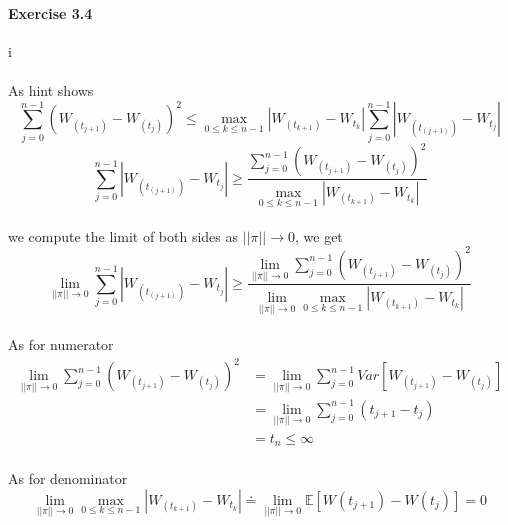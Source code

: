 \documentclass{article}
\begin{document}
\paragraph{Exercise 3.4}{i}
\paragraph{}{As hint shows \begin{displaymath}
                             \sum_{j=0}^{n-1}(W_{(t_{j+1})}-W_{(t_j)})^2 \le \max_{0\le k\le n-1}|W_{(t_{k+1})}-W_{t_{k}}| \sum_{j=0}^{n-1}|W_{(t_{(j+1)})}-W_{t_j}|
                           \end{displaymath}}
\begin{displaymath}
   \sum_{j=0}^{n-1}|W_{(t_{(j+1)})}-W_{t_j}|\ge \frac{ \sum_{j=0}^{n-1}(W_{(t_{j+1})}-W_{(t_j)})^2}{\max_{0\le k\le n-1}|W_{(t_{k+1})}-W_{t_{k}}|}
\end{displaymath}
\paragraph{}{we compute the limit of both sides as $||\pi|| \to 0 $, we get \begin{displaymath}
                                                                              \lim_{||\pi|| \to 0}\sum_{j=0}^{n-1}|W_{(t_{(j+1)})}-W_{t_j}|\ge
\frac{\lim_{||\pi|| \to 0}\sum_{j=0}^{n-1}(W_{(t_{j+1})}-W_{(t_j)})^2}{\lim_{||\pi|| \to 0}\max_{0\le k\le n-1}|W_{(t_{k+1})}-W_{t_{k}}|}
                                                                            \end{displaymath} }
\paragraph{}{As for numerator \begin{align*}
                                \lim_{||\pi|| \to 0}\sum_{j=0}^{n-1}(W_{(t_{j+1})}-W_{(t_j)})^2  & =\lim_{||\pi|| \to 0}\sum_{j=0}^{n-1}Var[W_{(t_{j+1})}-W_{(t_j)}]\\
                                &= \lim_{||\pi|| \to 0}\sum_{j=0}^{n-1}(t_{j+1}-t_{j})\\
                                & =t_{n}\le \infty
                              \end{align*}}
\paragraph{}{As for denominator \begin{displaymath}
\lim_{||\pi|| \to 0}\max_{0\le k\le n-1}|W_{(t_{k+1})}-W_{t_{k}}|  \doteq \lim_{||\pi|| \to 0} \mathbb{E}[W(t_{j+1})-W(t_j)]=0
\end{displaymath}}
\end{document}

